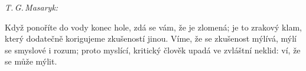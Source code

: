 \documentclass{article}
\def\citat#1#2{
\begin{center}
\footnotesize\emph{#1: }\parbox[t]{52.5mm}{#2}
\end{center}}
\begin{document}
\citat{T.\,G.\,Masaryk}{
Když ponoříte do vody konec hole, zdá se vám, že je zlomená; je to zrakový klam, který dodatečně korigujeme zkušeností jinou. Víme, že se zkušenost mýlívá, mýlí se smyslové i rozum; proto myslící, kritický člověk upadá ve zvláštní neklid: ví, že se může mýlit.
}
\end{document}
